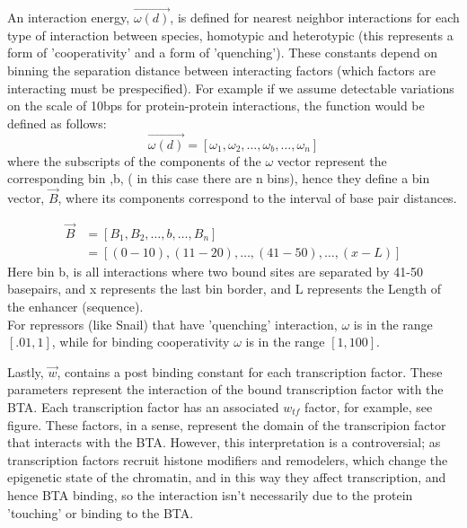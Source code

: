 An interaction energy,  $\overrightarrow{\omega(d)}$, is defined for nearest neighbor interactions for each type of interaction between species, homotypic and heterotypic (this represents a form of 'cooperativity' and a form of 'quenching').  These constants depend on binning the separation distance between interacting factors (which factors are interacting must be prespecified).  For example if we assume detectable variations on the scale of 10bps for protein-protein interactions, the function would be defined as follows:
\begin{equation}\label{}
   \overrightarrow{ \omega(d)} =  [ \omega_1 ,\omega_2 ,\ldots, \omega_b,\ldots,  \omega_n ]
\end{equation}
where the subscripts of the components of the $\omega$ vector represent the corresponding bin ,b, ( in this case there are n bins), hence they define a bin vector, $\overrightarrow{B}$, where its components correspond to the interval of base pair distances.

\begin{equation}\label{}
\begin{split}
 \overrightarrow{B}   &= [ B_1 ,B_2 ,\ldots, b, \ldots, B_n ] \\
     &=   [ (0-10), (11-20), \ldots,(41-50),\ldots, (x-L)]
    \end{split}
\end{equation}
Here bin b, is all interactions where two bound sites are separated by 41-50 basepairs, and x represents the last bin border, and L represents the Length of the enhancer (sequence). \\

For repressors (like Snail) that have 'quenching' interaction, $\omega$ is in the range $[.01,1]$, while for binding cooperativity $\omega$ is in the range $[1,100]$.

Lastly, $\overrightarrow{w}$, contains a post binding constant for each transcription factor.  These parameters represent the interaction of the bound transcription factor with the BTA.  Each transcription factor has an associated $w_{tf}$ factor, for example, see figure.  These factors, in a sense, represent the domain of the transcripion factor that interacts with the BTA.  However, this interpretation is a controversial; as transcription factors recruit histone modifiers and remodelers, which change the epigenetic state of the chromatin, and in this way they affect transcription, and hence BTA binding, so the interaction isn't necessarily due to the protein 'touching' or binding to the BTA.  
  

